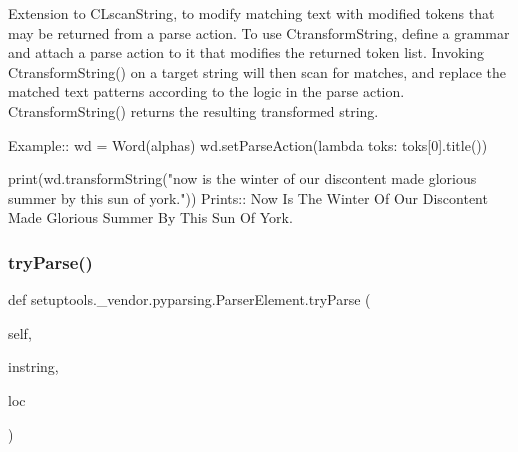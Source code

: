 \begin{DoxyVerb}Extension to C{L{scanString}}, to modify matching text with modified tokens that may
be returned from a parse action.  To use C{transformString}, define a grammar and
attach a parse action to it that modifies the returned token list.
Invoking C{transformString()} on a target string will then scan for matches,
and replace the matched text patterns according to the logic in the parse
action.  C{transformString()} returns the resulting transformed string.

Example::
    wd = Word(alphas)
    wd.setParseAction(lambda toks: toks[0].title())
    
    print(wd.transformString("now is the winter of our discontent made glorious summer by this sun of york."))
Prints::
    Now Is The Winter Of Our Discontent Made Glorious Summer By This Sun Of York.
\end{DoxyVerb}
 \mbox{\label{classsetuptools_1_1__vendor_1_1pyparsing_1_1ParserElement_a51e2e6e778178f5c669fb4ad6b1b8ded}} 
\subsubsection{\texorpdfstring{try\+Parse()}{tryParse()}}
{\footnotesize\ttfamily def setuptools.\+\_\+vendor.\+pyparsing.\+Parser\+Element.\+try\+Parse (\begin{DoxyParamCaption}\item[{}]{self,  }\item[{}]{instring,  }\item[{}]{loc }\end{DoxyParamCaption})}

\mbox{\label{classsetuptools_1_1__vendor_1_1pyparsing_1_1ParserElement_ad3e1e503c2a2e6bbece407e4e6b68651}} 
